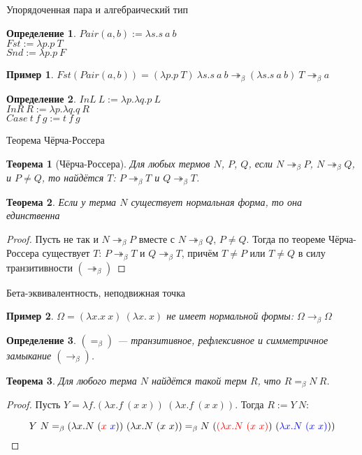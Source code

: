 \documentclass[aspectratio=169]{beamer}
\newtheorem{thm}{Теорема}[section]
\newtheorem{dfn}{Определение}[section]
\newtheorem{exm}{Пример}[section]
\begin{document}
\begin{frame}{Упорядоченная пара и алгебраический тип}
\begin{dfn}$Pair(a,b) := \lambda s.s\ a\ b$\\
$Fst := \lambda p.p\ T$\\
$Snd := \lambda p.p\ F$
\end{dfn}

\begin{exm}
$Fst (Pair (a,b)) = (\lambda p.p\ T)\ \lambda s.s\ a\ b \twoheadrightarrow_\beta (\lambda s.s\ a\ b)\ T \twoheadrightarrow_\beta a$
\end{exm}

\begin{dfn}
$InL\ L := \lambda p.\lambda q.p\ L$\\
$InR\ R := \lambda p.\lambda q.q\ R$\\
$Case\ t\ f\ g := t\ f\ g$
\end{dfn}

\end{frame}

\begin{frame}{Теорема Чёрча-Россера}
\begin{thm}[Чёрча-Россера] Для любых термов $N$, $P$, $Q$, если $N \twoheadrightarrow_\beta P$, $N \twoheadrightarrow_\beta Q$,
и $P \ne Q$, то найдётся $T$: $P \twoheadrightarrow_\beta T$ и $Q \twoheadrightarrow_\beta T$.\end{thm}
\begin{thm}Если у терма $N$ существует нормальная форма, то она единственна\end{thm}
\begin{proof}Пусть не так и $N \twoheadrightarrow_\beta P$ вместе с $N \twoheadrightarrow_\beta Q$, $P \ne Q$.
Тогда по теореме Чёрча-Россера существует $T$: $P \twoheadrightarrow_\beta T$ и $Q \twoheadrightarrow_\beta T$,
причём $T \ne P$ или $T \ne Q$ в силу транзитивности $(\twoheadrightarrow_\beta)$\end{proof}
\end{frame}

\begin{frame}{Бета-эквивалентность, неподвижная точка}
\begin{exm}$\Omega = (\lambda x.x\ x)\ (\lambda x.\ x)$ не имеет нормальной формы:
$\Omega \rightarrow_\beta \Omega$\end{exm}
\begin{dfn}$(=_\beta)$ --- транзитивное, рефлексивное и симметричное замыкание $(\rightarrow_\beta)$.\end{dfn}
\begin{thm}Для любого терма $N$ найдётся такой терм $R$, что $R =_\beta N\ R$.\end{thm}
\begin{proof}Пусть $Y = \lambda f.(\lambda x.f\ (x\ x))\ (\lambda x.f\ (x\ x))$.
Тогда $R := Y\ N$:

$$Y\ N =_\beta (\lambda x.N\ ({\color{red}x}\ {\color{blue}x}))\ (\lambda x.N\ (x\ x)) =_\beta N\ ({\color{red}(\lambda x.N\ (x\ x)})\ ({\color{blue}\lambda x.N\ (x\ x)}))$$
\end{proof}
\end{frame}
\end{document}
